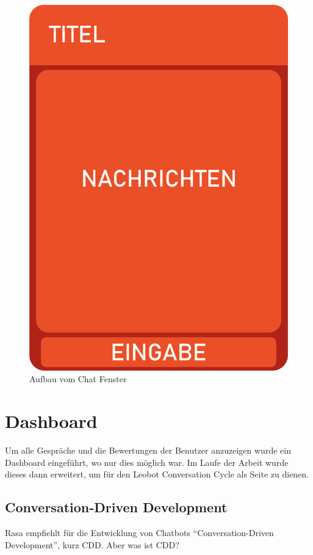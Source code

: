 \begin{figure}[hbt!]
    \centering
    \includegraphics[scale=0.2]{pics/chatWidgetStructure}
    \caption{Aufbau vom Chat Fenster}
    \label{fig:impl:chatWidget}
\end{figure}


\section{Dashboard}\label{sec:dashboard}

Um alle Gespräche und die Bewertungen der Benutzer anzuzeigen wurde ein Dashboard eingeführt, wo nur dies möglich war.
Im Laufe der Arbeit wurde dieses dann erweitert, um für den Leobot Conversation Cycle als Seite zu dienen.

\subsection{Conversation-Driven Development}\label{cdd}
Rasa empfiehlt für die Entwicklung von Chatbots ``Conversation-Driven Development'', kurz CDD.\cite{cdd}
Aber was ist CDD?

